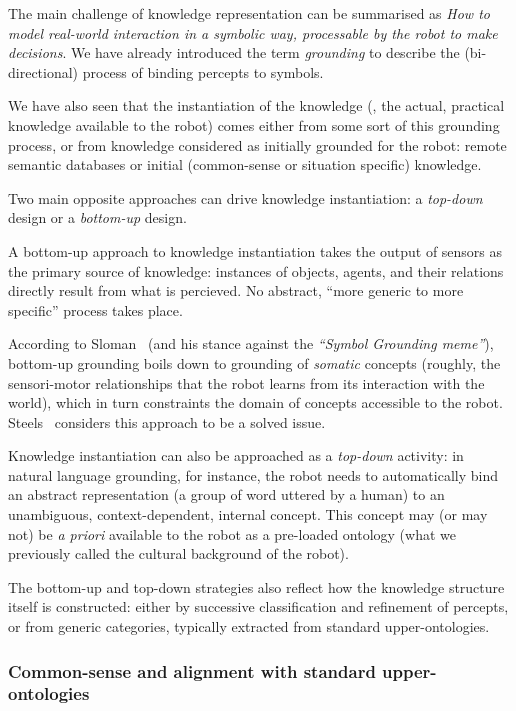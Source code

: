 The main challenge of knowledge representation can be summarised as \emph{How to
model real-world interaction in a symbolic way, processable by the robot to
make decisions}. We have already introduced the term \emph{grounding} to
describe the (bi-directional) process of binding percepts to symbols.

We have also seen that the instantiation of the knowledge (\ie, the actual,
practical knowledge available to the robot) comes either from some sort of this
grounding process, or from knowledge considered as initially grounded for the
robot: remote semantic databases or initial (common-sense or situation
specific) knowledge.

Two main opposite approaches can drive knowledge instantiation: a
\emph{top-down} design or a \emph{bottom-up} design.

A bottom-up approach to knowledge instantiation takes the output of sensors as
the primary source of knowledge: instances of objects, agents, and their
relations directly result from what is percieved. No abstract, ``more generic
to more specific'' process takes place.

According to Sloman~\cite{Sloman2007} (and his stance against the
\emph{``Symbol Grounding meme''}), bottom-up grounding boils down to grounding
of \emph{somatic} concepts (\ie roughly, the sensori-motor relationships that
the robot learns from its interaction with the world), which in turn
constraints the domain of concepts accessible to the robot.
Steels~\cite{Steels2007} considers this approach to be a solved issue.

Knowledge instantiation can also be approached as a \emph{top-down} activity:
in natural language grounding, for instance, the robot needs to automatically
bind an abstract representation (a group of word uttered by a human) to an
unambiguous, context-dependent, internal concept. This concept may (or may not)
be \textit{a priori} available to the robot as a pre-loaded ontology (what we
previously called the cultural background of the robot).

The bottom-up and top-down strategies also reflect how the knowledge structure
itself is constructed: either by successive classification and refinement of
percepts, or from generic categories, typically extracted from standard
upper-ontologies.

\subsubsection{Common-sense and alignment with standard upper-ontologies}

